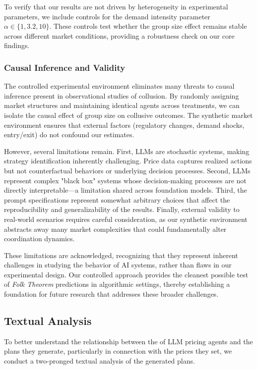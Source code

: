 To verify that our results are not driven by heterogeneity in experimental parameters, we include controls for the demand intensity parameter $\alpha \in \{1, 3.2, 10\}$. These controls test whether the group size effect remains stable across different market conditions, providing a robustness check on our core findings.

\subsubsection*{Causal Inference and Validity}

The controlled experimental environment eliminates many threats to causal inference present in observational studies of collusion. By randomly assigning market structures and maintaining identical agents across treatments, we can isolate the causal effect of group size on collusive outcomes. The synthetic market environment ensures that external factors (regulatory changes, demand shocks, entry/exit) do not confound our estimates.

However, several limitations remain. First, LLMs are stochastic systems, making strategy identification inherently challenging. Price data captures realized actions but not counterfactual behaviors or underlying decision processes. Second, LLMs represent complex "black box" systems whose decision-making processes are not directly interpretable—a limitation shared across foundation models. Third, the prompt specifications represent somewhat arbitrary choices that affect the reproducibility and generalizability of the results. Finally, external validity to real-world scenarios requires careful consideration, as our synthetic environment abstracts away many market complexities that could fundamentally alter coordination dynamics.

These limitations are acknowledged, recognizing that they represent inherent challenges in studying the behavior of AI systems, rather than flaws in our experimental design. Our controlled approach provides the cleanest possible test of \emph{Folk Theorem} predictions in algorithmic settings, thereby establishing a foundation for future research that addresses these broader challenges.

\subsection{Textual Analysis}

To better understand the relationship between the  of LLM pricing agents and the plans they generate, particularly in connection with the prices they set, we conduct a two-pronged textual analysis of the generated plans.

